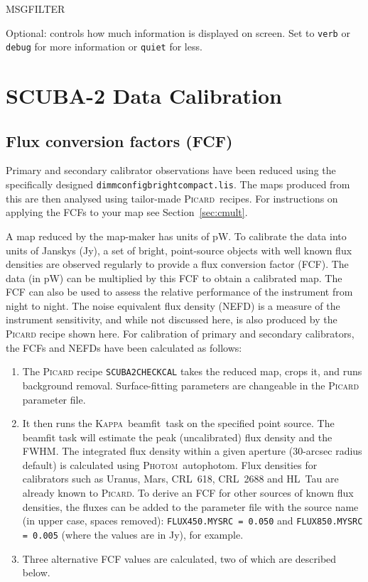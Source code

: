 \documentclass[twoside,11pt]{article}
\newcommand{\htmlref}[2]{#1}
\newcommand{\latexhtml}[2]{#1}
\newcommand{\xref}[3]{#1}
\newcommand{\xlabel}[1]{}
\renewcommand{\_}{\texttt{\symbol{95}}}
\newcommand{\Kappa}{\xref{\textsc{Kappa}}{sun95}{}}
\newcommand{\photom}{\xref{\textsc{Photom}}{sun45}{}}
\newcommand{\picard}{\xref{\textsc{Picard}}{sun265}{}}
\newcommand{\drrecipe}[1]{\texttt{#1}}
\newcommand{\task}[1]{\textsf{#1}}
\newcommand{\beamfit}{\xref{\task{beamfit}}{sun95}{BEAMFIT}}
\newcommand{\autophotom}{\xref{\task{autophotom}}{sun45}{AUTOPHOTOM}}
\newcommand{\cref}[3]{\latexhtml{#1~\ref{#2}}{\htmlref{#3}{#2}}}
\begin{document}
\begin{minipage}[t]{0.2\linewidth}
MSG\_FILTER
\end{minipage}
\begin{minipage}[t]{0.8\linewidth}Optional: controls how much
information is displayed on screen. Set to \texttt{verb} or
\texttt{debug} for more information or \texttt{quiet} for less.
\end{minipage}


\newpage
\section{\xlabel{calib}SCUBA-2 Data Calibration}
\label{app:cal}

\subsection{\xlabel{fcf}Flux conversion factors (FCF)}
\label{app:fcf}

Primary and secondary calibrator observations have been reduced using
the specifically designed \texttt{dimmconfig\_bright\_compact.lis}.
The maps produced from this are then analysed using tailor-made
\picard\ recipes. For instructions on applying the FCFs to your map see
\cref{Section}{sec:cmult}{this page}.

A map reduced by the map-maker has units of pW. To calibrate the data
into units of Janskys (Jy), a set of bright, point-source objects with
well known flux densities are observed regularly to provide a flux
conversion factor (FCF). The data (in pW) can be multiplied by this FCF
to obtain a calibrated map. The FCF can also be used to assess the
relative performance of the instrument from night to night. The noise
equivalent flux density (NEFD) is a measure of the instrument
sensitivity, and while not discussed here, is also produced by the
\textsc{Picard} recipe shown here. For calibration of primary and secondary
calibrators, the FCFs and NEFDs have been calculated as follows:

\begin{enumerate}
\item{The \textsc{Picard} recipe \drrecipe{SCUBA2\_CHECK\_CAL} takes the reduced
map, crops it, and runs background removal. Surface-fitting
parameters are changeable in the \textsc{Picard} parameter file.}
\item{It then runs the \Kappa\ \beamfit\ task on the specified point
source. The \task{beamfit} task will estimate the peak (uncalibrated)
flux density and the FWHM. The integrated flux density within a
given aperture (30-arcsec radius default) is calculated using
\photom\ \autophotom. Flux densities for calibrators such as Uranus,
Mars, CRL~618, CRL~2688 and HL~Tau are already known to
\picard. To derive an FCF for other sources of known flux densities,
the fluxes can be added to the parameter file with the source name
(in upper case, spaces removed): \texttt{FLUX\_450.MYSRC = 0.050}
and \texttt{FLUX\_850.MYSRC = 0.005} (where the values are in Jy),
for example.}

\item {Three alternative FCF values are calculated, two of which are
described below.}
\end{enumerate}
\end{document}
